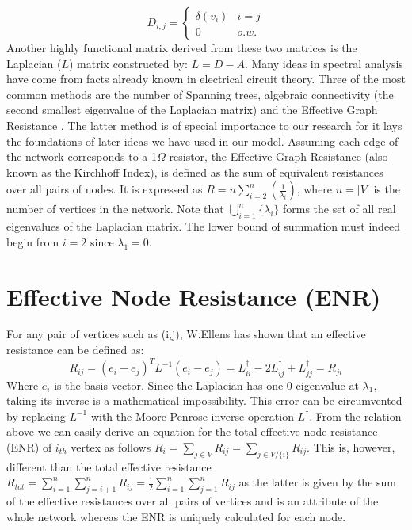 \documentclass{article}
\begin{document}
	\begin{equation*}
		D_{i,j} = \begin{cases}
			\delta(v_i) & i=j \\
			0 & o.w.
		\end{cases}
	\end{equation*}
	Another highly functional matrix derived from these two matrices is the Laplacian ($L$) matrix constructed by: $L=D-A$. Many ideas in spectral analysis have come from facts already known in electrical circuit theory. Three of the most common methods are the number of Spanning trees, algebraic connectivity (the second smallest eigenvalue of the Laplacian matrix) and the Effective Graph Resistance \cite{ellens2013graph}. The latter method is of special importance to our research for it lays the foundations of later ideas we have used in our model. 
	Assuming each edge of the network corresponds to a 1$\Omega$ resistor, the Effective Graph Resistance (also known as the Kirchhoff Index), is defined as the sum of equivalent resistances over all pairs of nodes. It is expressed as
	$R = n \sum_{i=2}^{n}(\frac{1}{\lambda_{i}})$, where $n = |V|$ is the number of vertices in the network\cite{klein1993m}\cite{yamashita2021effective}. Note that $\bigcup_{i=1}^{n} \{\lambda_i\}$ forms the set of all real eigenvalues of the Laplacian matrix. The lower bound of summation must indeed begin from $i=2$ since $\lambda_1 = 0$.
	
	\section{Effective Node Resistance (ENR)}
	For any pair of vertices such as (i,j), W.Ellens \cite{ellens2013graph} has shown that an effective resistance can be defined as:
	\begin{equation}
		R_{ij} = (e_i-e_j)^T  L^{-1} (e_i-e_j) = L_{ii}^{\dag} -2L_{ij}^{\dag} + L_{jj}^{\dag}= R_{ji}
	\end{equation}
	Where $e_i$ is the basis vector. Since the Laplacian has one 0 eigenvalue at $\lambda_1$, taking its inverse is a mathematical impossibility. This error can be circumvented by replacing $L^{-1}$ with the Moore-Penrose inverse operation $L^\dag$. From the relation above we can easily derive an equation for the total effective node resistance (ENR) of $i_{th}$ vertex as follows $R_i = \sum_{j\in V}R_{ij} = \sum_{j\in V/ \{i\}} R_{ij}$. This is, however, different than the total effective resistance $R_{tot}= \sum_{i=1}^{n}\sum_{j=i+1}^{n}R_{ij} = \frac{1}{2}\sum_{i=1}^{n}\sum_{j=1}^{n}R_{ij}$ as the latter is given by the sum of the effective resistances over
	all pairs of vertices and is an attribute of the whole network whereas the ENR is uniquely calculated for each node.
	
\end{document}
